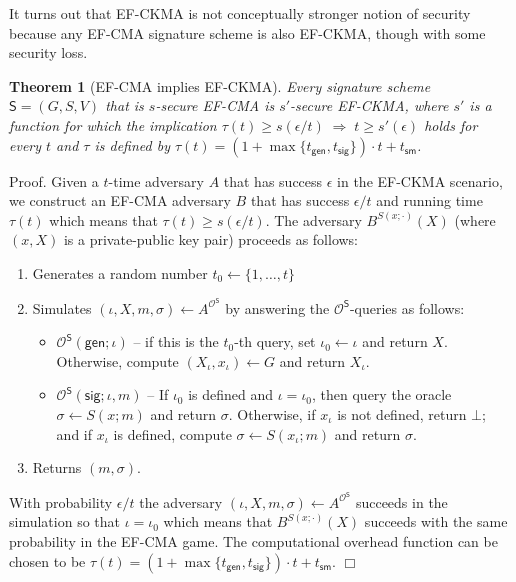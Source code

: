 \documentclass{article}
\newtheorem{theorem}{Theorem}[section]
\newenvironment{proof}{\textsf{Proof}.}{\hfill$\Box$}
\begin{document}
It turns out that EF-CKMA is not conceptually stronger notion of security because any EF-CMA signature scheme is also EF-CKMA, though with some security loss.

\begin{theorem}[EF-CMA implies EF-CKMA]
Every signature scheme $\mathsf{S}=(G,S,V)$ that is $s$-secure EF-CMA is $s'$-secure EF-CKMA, where $s'$ is a function for which the implication $\tau(t)\ge s(\epsilon/t) \; \Rightarrow \; t\ge s'(\epsilon)$ holds for every $t$ and $\tau$ is defined by $\tau(t)=(1+\max\{t_\mathsf{gen},t_\mathsf{sig}\})\cdot t + t_\mathsf{sm}$.
\end{theorem}
\begin{proof}
Given a $t$-time adversary $A$ that has success $\epsilon$ in the EF-CKMA scenario, we construct an EF-CMA adversary $B$ that has success $\epsilon/t$ and running time $\tau(t)$ which means that $\tau(t)\ge s(\epsilon/t)$. The adversary $B^{S(x;\cdot)}(X)$ (where $(x,X)$ is a private-public key pair) proceeds as follows:
\begin{enumerate}
\item Generates a random number $t_0\gets \{1,\ldots,t\}$
\item Simulates $(\iota,X,m,\sigma)\gets A^{\mathcal{O}^\mathsf{S}}$ by answering the $\mathcal{O}^\mathsf{S}$-queries as follows:
\begin{itemize}
\item $\mathcal{O}^\mathsf{S}(\mathsf{gen};\iota)$ -- if this is the $t_0$-th query, set $\iota_0\gets \iota$ and return $X$. Otherwise, compute $(X_\iota,x_\iota)\gets G$ and return $X_\iota$.
\item $\mathcal{O}^\mathsf{S}(\mathsf{sig};\iota,m)$ -- If $\iota_0$ is defined and $\iota=\iota_0$, then query the oracle $\sigma\gets S(x;m)$ and return $\sigma$. Otherwise, if $x_\iota$ is not defined, return $\bot$; and if $x_\iota$ is defined, compute $\sigma \gets S(x_\iota;m)$ and return $\sigma$.
\end{itemize}
\item Returns $(m,\sigma)$.
\end{enumerate}
With probability $\epsilon/t$ the adversary $(\iota,X,m,\sigma)\gets A^{\mathcal{O}^\mathsf{S}}$ succeeds in the simulation so that $\iota=\iota_0$ which means that $B^{S(x;\cdot)}(X)$ succeeds with the same probability in the EF-CMA game. The computational overhead function can be chosen to be $\tau(t)=(1+\max\{t_\mathsf{gen},t_\mathsf{sig}\})\cdot t + t_\mathsf{sm}$.
\end{proof}
\end{document}

